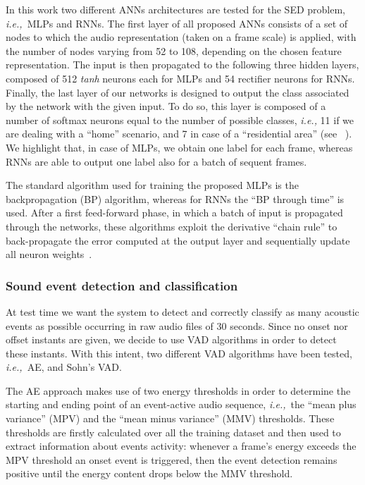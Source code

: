 In this work two different ANNs architectures are tested for the SED problem, \emph{i.e.,}\ MLPs and RNNs.
The first layer of all proposed ANNs consists of a set of nodes to which the audio representation (taken on a frame scale) is applied, with the number of nodes varying from 52 to 108, depending on the chosen feature representation. The input is then propagated to the following three hidden layers, composed of 512 \textit{tanh} neurons each for MLPs and 54 rectifier neurons for RNNs.  Finally, the last layer of our networks is designed to output the class associated by the network with the given input. To do so, this layer is composed of a number of softmax neurons equal to the number of possible classes, \emph{i.e.,} 11 if we are dealing with a ``home'' scenario, and 7 in case of a ``residential area'' (see ~). We highlight that, in case of MLPs, we obtain one label for each frame, whereas RNNs are able to output one label also for a batch of sequent frames.

The standard algorithm used for training the proposed MLPs is the backpropagation (BP) algorithm, whereas for RNNs the ``BP through time'' is used. After a first feed-forward phase, in which a batch of input is propagated through the networks, these algorithms exploit the derivative ``chain rule'' to back-propagate the error computed at the output layer and sequentially update all neuron weights~\cite{rojas2013neural}.

\subsubsection{Sound event detection and classification}

At test time we want the system to detect and correctly classify as many acoustic events as possible occurring in raw audio files of 30 seconds. Since no onset nor offset instants are given, we decide to use VAD algorithms in order to detect these instants. With this intent, two different VAD algorithms have been tested, \emph{i.e.,}\ AE, and Sohn's VAD. 

The AE approach makes use of two energy thresholds in order to determine the starting and ending point of an event-active audio sequence, \emph{i.e.,}\ the ``mean plus variance'' (MPV) and the ``mean minus variance'' (MMV) thresholds. These thresholds are firstly calculated over all the training dataset and then used to extract information about events activity: whenever a frame's energy exceeds the MPV threshold an onset event is triggered, then the event detection remains positive until the energy content drops below the MMV threshold. 

